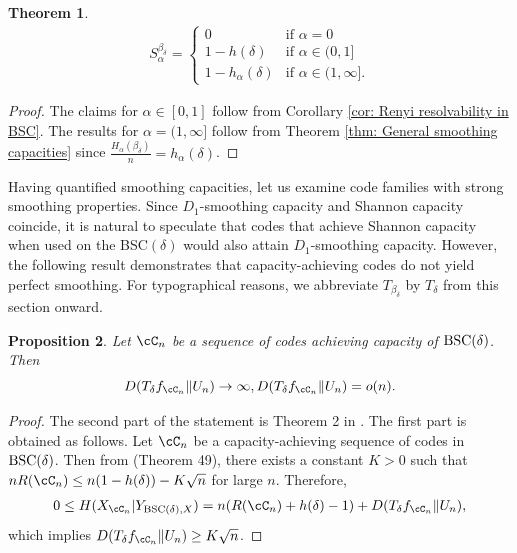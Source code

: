 \documentclass{amsart}
\newtheorem{theorem}{Theorem}[section]
\newtheorem{proposition}[theorem]{Proposition}
\theoremstyle{remark}
\begin{document}
\begin{theorem}\label{thm: Bernoulli-smoothing capacities}
\begin{align}
    S_{\alpha}^{\beta_{\delta}}= 
\left\{
	\begin{array}{lll}
		0             & \mbox{if } \alpha = 0\\[.05in]
		1-h(\delta)   & \mbox{if } \alpha \in (0,1]\\[.05in]
            1-h_{\alpha} (\delta) & \mbox{if } \alpha \in (1,\infty].
	\end{array}
\right.
\end{align} 
\end{theorem}
%
\begin{proof}  The claims for $\alpha\in[0,1]$ follow from Corollary \ref{cor: Renyi resolvability in BSC}.
The results for $\alpha=(1,\infty]$ follow from Theorem \ref{thm: General smoothing capacities} since $\frac{H_{\alpha}(\beta_{\delta})}{n} = h_{\alpha}(\delta)$.
\end{proof} 
Having quantified smoothing capacities, let us examine code families with strong smoothing properties.
Since $D_1$-smoothing capacity and Shannon capacity coincide, it is natural to speculate that codes that achieve Shannon capacity
when used on the BSC$(\delta)$ would also attain $D_1$-smoothing capacity.
However, the following result demonstrates that capacity-achieving codes do not yield perfect smoothing. For typographical reasons, we abbreviate $T_{\beta_\delta}$ by $T_{\delta}$ from this section onward.

\begin{proposition}\label{prop: Bernoulli smoothing cap.-achieving codes}
    Let $\cC_n$ be a sequence of codes achieving capacity of ${\text{\rm BSC}}(\delta)$. Then 
      $$
      D(T_{\delta}f_{\cC_n}\|U_n)  \rightarrow \infty, D(T_{\delta}f_{\cC_n}\|U_n) = o(n).
      $$
\end{proposition}     
\begin{proof}
    The second part of the statement is  Theorem 2 in \cite{shamai1997empirical}. The first part is obtained as follows. 
    Let $\cC_n$ be a capacity-achieving sequence of codes in ${\text{\rm BSC}}(\delta)$. Then from \cite{polyanskiy2010channel} (Theorem 49), there exists a constant $K>0$ such that $nR(\cC_n) \leq n(1-h(\delta)) - K\sqrt{n}$ for large $n$. Therefore, 
    \begin{align*}
        0 \leq  H(X_{\cC_n}|Y_{{\text{\rm BSC}}(\delta),X}) = n(R(\cC_n)+h(\delta)-1)+ D(T_{\delta}f_{\cC_n}\|U_n),
    \end{align*}
    which implies $D(T_{\delta}f_{\cC_n}\|U_n) \geq K\sqrt{n}$.
\end{proof}
\end{document}
